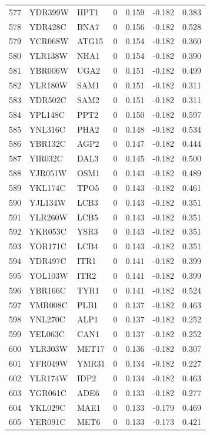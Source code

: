 \begin{longtable}{rllrrrr}
577 & YDR399W & HPT1 & 0 & 0.159 & -0.182 & 0.383\\
578 & YDR428C & BNA7 & 0 & 0.156 & -0.182 & 0.528\\
579 & YCR068W & ATG15 & 0 & 0.154 & -0.182 & 0.360\\
580 & YLR138W & NHA1 & 0 & 0.154 & -0.182 & 0.390\\
581 & YBR006W & UGA2 & 0 & 0.151 & -0.182 & 0.499\\
582 & YLR180W & SAM1 & 0 & 0.151 & -0.182 & 0.311\\
583 & YDR502C & SAM2 & 0 & 0.151 & -0.182 & 0.311\\
584 & YPL148C & PPT2 & 0 & 0.150 & -0.182 & 0.597\\
585 & YNL316C & PHA2 & 0 & 0.148 & -0.182 & 0.534\\
586 & YBR132C & AGP2 & 0 & 0.147 & -0.182 & 0.444\\
587 & YIR032C & DAL3 & 0 & 0.145 & -0.182 & 0.500\\
588 & YJR051W & OSM1 & 0 & 0.143 & -0.182 & 0.489\\
589 & YKL174C & TPO5 & 0 & 0.143 & -0.182 & 0.461\\
590 & YJL134W & LCB3 & 0 & 0.143 & -0.182 & 0.351\\
591 & YLR260W & LCB5 & 0 & 0.143 & -0.182 & 0.351\\
592 & YKR053C & YSR3 & 0 & 0.143 & -0.182 & 0.351\\
593 & YOR171C & LCB4 & 0 & 0.143 & -0.182 & 0.351\\
594 & YDR497C & ITR1 & 0 & 0.141 & -0.182 & 0.399\\
595 & YOL103W & ITR2 & 0 & 0.141 & -0.182 & 0.399\\
596 & YBR166C & TYR1 & 0 & 0.141 & -0.182 & 0.524\\
597 & YMR008C & PLB1 & 0 & 0.137 & -0.182 & 0.463\\
598 & YNL270C & ALP1 & 0 & 0.137 & -0.182 & 0.252\\
599 & YEL063C & CAN1 & 0 & 0.137 & -0.182 & 0.252\\
600 & YLR303W & MET17 & 0 & 0.136 & -0.182 & 0.307\\
601 & YFR049W & YMR31 & 0 & 0.134 & -0.182 & 0.227\\
602 & YLR174W & IDP2 & 0 & 0.134 & -0.182 & 0.463\\
603 & YGR061C & ADE6 & 0 & 0.133 & -0.182 & 0.277\\
604 & YKL029C & MAE1 & 0 & 0.133 & -0.179 & 0.469\\
605 & YER091C & MET6 & 0 & 0.133 & -0.173 & 0.421\\

\end{longtable}
